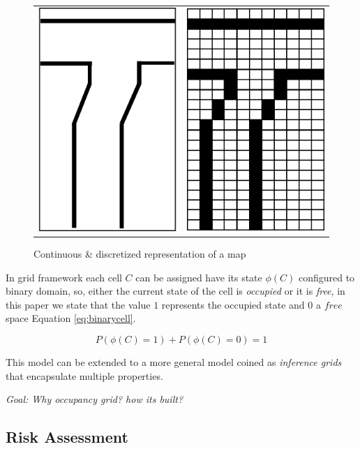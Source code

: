 \begin{figure}[h]
\centering
	\begin{tabular}{lr}\\
		\includegraphics[width=0.25\columnwidth]{img/fig:grid:continuous} &
		\includegraphics[width=0.25\columnwidth]{img/fig:grid:discretized}
	\end{tabular}
	\caption{Continuous \& discretized representation of a map}
	\label{fig:grid:continuous:discretized}
\end{figure}


In grid framework each cell $C$ can be assigned have its state $\phi(C)$ configured to binary domain, so, either the current state of the cell is \textit{occupied} or it is \textit{free}, in this paper we state that the value $1$ represents the occupied state and $0$ a $free$ space Equation \ref{eq:binarycell}.

\begin{equation}
P(\phi(C)=1) + P(\phi(C)=0) = 1
\label{eq:binarycell}
\end{equation}

This model can be extended to a more general model coined as \textit{inference grids} that encapsulate multiple properties\cite{Elfes:1989:OGP:916528}.

\textit{Goal: Why occupancy grid? how its built? }

\subsection{Risk Assessment}



